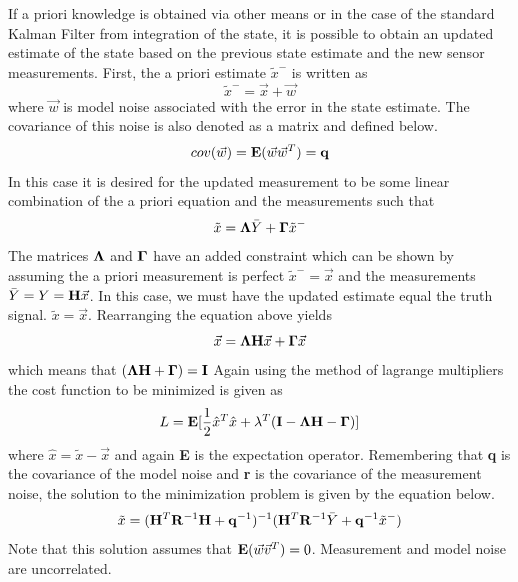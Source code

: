 \documentclass{article}
\begin{document}
If a priori knowledge is obtained via other means or in the case of
the standard Kalman Filter from integration of the state, it is
possible to obtain an updated estimate of the state based on the
previous state estimate and the new sensor measurements. First, the a
priori estimate $\tilde{x}^{-}$ is written as 
\begin{equation}
  \tilde{x}^{-} = \vec{x} +  \vec{w}
\end{equation}
where $\vec{w}$ is model noise associated with the error in the
state estimate. The covariance of this noise is also denoted as a
matrix and defined below.
\begin{equation}
  cov(\vec{w}) = {\bf E}(\vec{w}\vec{w}^T) = {\bf q}
\end{equation}
In this case it is desired for the updated measurement to be some
linear combination of the a priori equation and the measurements such
that
\begin{equation}
  \tilde{x} = {\bf \Lambda}\bar{Y} + {\bf \Gamma}\tilde{x}^{-}
\end{equation}
The matrices ${\bf \Lambda}$ and ${\bf \Gamma}$ have an added constraint
which can be shown by assuming the a priori measurement is perfect
$\tilde{x}^- = \vec{x}$ and the measurements $\bar{Y} = Y = {\bf
  H}\vec{x}$. In this case, we must have the updated estimate equal
the truth signal. $\tilde{x} = \vec{x}$. Rearranging the equation above yields
\begin{equation}
  \vec{x} = {\bf \Lambda}{\bf H}\vec{x} + {\bf \Gamma}\vec{x}
\end{equation}
which means that $({\bf \Lambda}{\bf H} + {\bf \Gamma}) = {\bf I}$
Again using the method of lagrange multipliers the cost function to be
minimized is given as
\begin{equation}
  L = {\bf E}[\frac{1}{2}\hat{x}^T\hat{x} + \lambda^T({\bf I} - {\bf
    \Lambda}{\bf H} - {\bf \Gamma})]
\end{equation}
where $\hat{x} = \tilde{x} - \vec{x}$ and again {\bf E} is the
expectation operator. Remembering that {\bf q} is
the covariance of the model noise and {\bf r} is the covariance of the
measurement noise, the solution to the minimization problem is given
by the equation below. 
\begin{equation}
  \tilde{x} = ({\bf H}^T{\bf R}^{-1}{\bf H}+{\bf q}^{-1})^{-1}({\bf
    H}^T{\bf R}^{-1}\bar{Y}+{\bf q}^{-1}\tilde{x}^{-})
\end{equation}
Note that this solution assumes that ${\bf E}(\vec{w}\vec{v}^T) = 0$. Measurement and model noise are uncorrelated.
\end{document}
